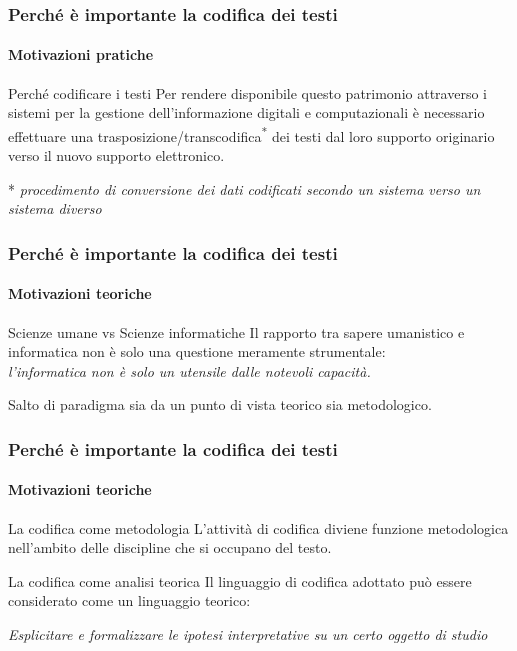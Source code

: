 \begin{frame}
    \frametitle{Perché è importante la codifica dei testi}
    \framesubtitle{Motivazioni pratiche}
    \addtocounter{nframe}{1}
    
    \begin{block}{Perché codificare i testi}
        Per rendere disponibile questo patrimonio attraverso i sistemi per la gestione dell'informazione digitali e computazionali è necessario effettuare una trasposizione/transcodifica\textsuperscript{*} dei testi dal loro supporto originario verso il nuovo supporto elettronico.
    \end{block}

    \begin{center}
        * \textit{procedimento di conversione dei dati codificati secondo un sistema verso un sistema diverso}
    \end{center}

\end{frame}

\begin{frame}
    \frametitle{Perché è importante la codifica dei testi}
    \framesubtitle{Motivazioni teoriche}
    \addtocounter{nframe}{1}
    
    \begin{block}{Scienze umane vs Scienze informatiche}
        Il rapporto tra sapere umanistico e informatica non è solo una questione meramente strumentale:\\ 
        \textit{l'informatica non è solo un utensile dalle notevoli capacità.}

        \begin{center}
            Salto di paradigma sia da un punto di vista teorico sia metodologico.
        \end{center} 
    \end{block}

\end{frame}

\begin{frame}
    \frametitle{Perché è importante la codifica dei testi}
    \framesubtitle{Motivazioni teoriche}
    \addtocounter{nframe}{1}
    
    \begin{block}{La codifica come metodologia}
        L'attività di codifica diviene funzione metodologica nell'ambito delle discipline che si occupano del testo.
     \end{block}

     \begin{block}{La codifica come analisi teorica}
     Il linguaggio di codifica adottato può essere considerato come un linguaggio teorico:
      
     \begin{center}
        \textit{Esplicitare e formalizzare le ipotesi interpretative su un certo oggetto di studio}
     \end{center} 
    \end{block}

\end{frame}

